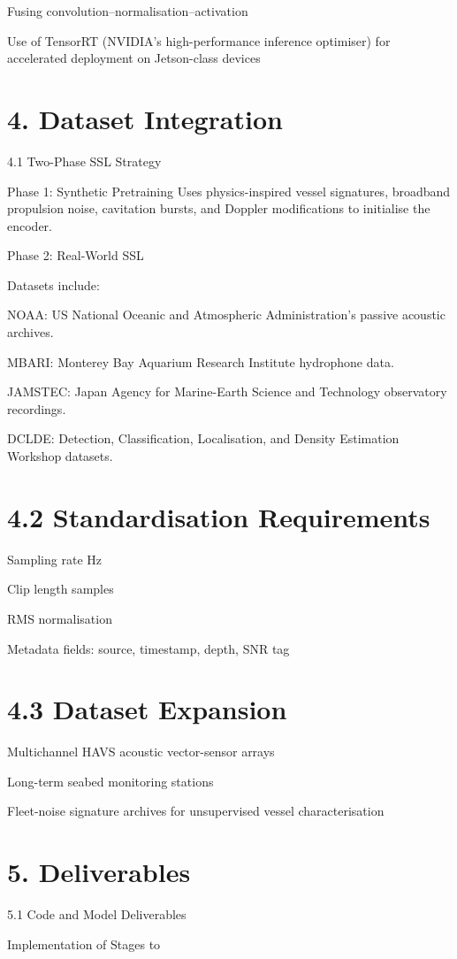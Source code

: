\documentclass[12pt]{article}
\begin{document}
Fusing convolution–normalisation–activation

Use of TensorRT (NVIDIA’s high-performance inference optimiser) for accelerated deployment on Jetson-class devices

\section*{4. Dataset Integration}
4.1 Two-Phase SSL Strategy

Phase 1: Synthetic Pretraining Uses physics-inspired vessel signatures, broadband propulsion noise, cavitation bursts, and Doppler modifications to initialise the encoder.

Phase 2: Real-World SSL

Datasets include:

NOAA: US National Oceanic and Atmospheric Administration’s passive acoustic archives.

MBARI: Monterey Bay Aquarium Research Institute hydrophone data.

JAMSTEC: Japan Agency for Marine-Earth Science and Technology observatory recordings.

DCLDE: Detection, Classification, Localisation, and Density Estimation Workshop datasets.

\section*{4.2 Standardisation Requirements}
Sampling rate  Hz

Clip length  samples

RMS normalisation

Metadata fields: source, timestamp, depth, SNR tag

\section*{4.3 Dataset Expansion}
Multichannel HAVS acoustic vector-sensor arrays

Long-term seabed monitoring stations

Fleet-noise signature archives for unsupervised vessel characterisation

\section*{5. Deliverables}
5.1 Code and Model Deliverables

Implementation of Stages  to
\end{document}
